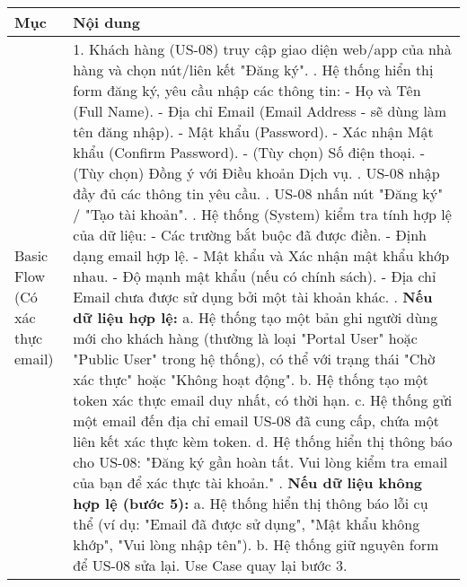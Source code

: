 \begin{longtable}{|m{4cm}|p{11cm}|}
\hline
\textbf{Mục} & \textbf{Nội dung} \\
\hline
Basic Flow (Có xác thực email) & 1. Khách hàng (US-08) truy cập giao diện web/app của nhà hàng và chọn nút/liên kết "Đăng ký". \newline 2. Hệ thống hiển thị form đăng ký, yêu cầu nhập các thông tin: \newline    - Họ và Tên (Full Name). \newline    - Địa chỉ Email (Email Address - sẽ dùng làm tên đăng nhập). \newline    - Mật khẩu (Password). \newline    - Xác nhận Mật khẩu (Confirm Password). \newline    - (Tùy chọn) Số điện thoại. \newline    - (Tùy chọn) Đồng ý với Điều khoản Dịch vụ. \newline 3. US-08 nhập đầy đủ các thông tin yêu cầu. \newline 4. US-08 nhấn nút "Đăng ký" / "Tạo tài khoản". \newline 5. Hệ thống (System) kiểm tra tính hợp lệ của dữ liệu: \newline    - Các trường bắt buộc đã được điền. \newline    - Định dạng email hợp lệ. \newline    - Mật khẩu và Xác nhận mật khẩu khớp nhau. \newline    - Độ mạnh mật khẩu (nếu có chính sách). \newline    - Địa chỉ Email chưa được sử dụng bởi một tài khoản khác. \newline 6. \textbf{Nếu dữ liệu hợp lệ:} \newline    a. Hệ thống tạo một bản ghi người dùng mới cho khách hàng (thường là loại "Portal User" hoặc "Public User" trong hệ thống), có thể với trạng thái "Chờ xác thực" hoặc "Không hoạt động". \newline    b. Hệ thống tạo một token xác thực email duy nhất, có thời hạn. \newline    c. Hệ thống gửi một email đến địa chỉ email US-08 đã cung cấp, chứa một liên kết xác thực kèm token. \newline    d. Hệ thống hiển thị thông báo cho US-08: "Đăng ký gần hoàn tất. Vui lòng kiểm tra email của bạn để xác thực tài khoản." \newline 7. \textbf{Nếu dữ liệu không hợp lệ (bước 5):} \newline    a. Hệ thống hiển thị thông báo lỗi cụ thể (ví dụ: "Email đã được sử dụng", "Mật khẩu không khớp", "Vui lòng nhập tên"). \newline    b. Hệ thống giữ nguyên form để US-08 sửa lại. Use Case quay lại bước 3. \\

\end{longtable}
